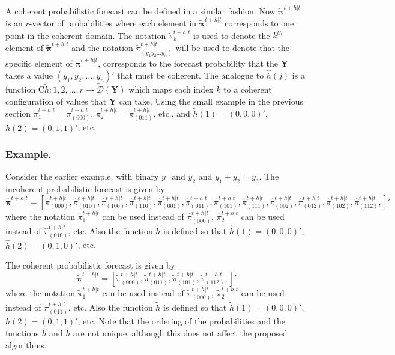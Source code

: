 \documentclass[a4paper,review,12pt,authoryear]{elsarticle}
\newcommand{\bY}{\mathbf{Y}}
\newcommand{\bpi}{\bm{\pi}}
\begin{document}
  A coherent probabilistic forecast can be defined in a similar fashion. Now $\tilde{\bpi}^{t+h|t}$ is an $r$-vector of probabilities where each element in $\tilde{\bpi}^{t+h|t}$ corresponds to one point in the coherent domain. The notation $\tilde{\pi}_k^{t+h|t}$ is used to denote the $k^{th}$ element of $\tilde{\bpi}^{t+h|t}$ and the notation $\tilde{\pi}_{(y_1 y_2 \dots y_n)}^{t+h|t}$ will be used to denote that the specific element of $\tilde{\bpi}^{t+h|t}$, corresponds to the forecast probability that the $\bY$ takes a value $(y_1,y_2,\dots,y_n)'$ that must be coherent. The analogue to $\hat{h}(j)$ is a function  C$\tilde{h}:{1,2,\dots,r}\rightarrow\tilde{\mathcal{D}}(\bY)$ which maps each index $k$ to a coherent configuration of values that $\bY$ can take. Using the small example in the previous section $\tilde{\pi}_1^{t+h|t}=\tilde{\pi}_{(000)}^{t+h|t}$, $\tilde{\pi}_2^{t+h|t}=\tilde{\pi}_{(011)}^{t+h|t}$, etc., and $\tilde{h}(1)=(0,0,0)'$, $\tilde{h}(2)=(0,1,1)'$, etc.
  
  \subsubsection*{\textbf{Example}.}
  
  Consider the earlier example, with binary $y_1$ and $y_2$ and $y_1+y_2=y_3$. The incoherent probabilistic forecast is given by
  \[
    \hat{\bpi}^{t+h|t}= \left[       
      \hat{\pi}^{t+h|t}_{(000)},
       \hat{\pi}^{t+h|t}_{(010)},
       \hat{\pi}^{t+h|t}_{(100)},
       \hat{\pi}^{t+h|t}_{(110)},
       \hat{\pi}^{t+h|t}_{(001)},
       \hat{\pi}^{t+h|t}_{(011)},
       \hat{\pi}^{t+h|t}_{(101)},
       \hat{\pi}^{t+h|t}_{(111)},
       \hat{\pi}^{t+h|t}_{(002)},
       \hat{\pi}^{t+h|t}_{(012)},
       \hat{\pi}^{t+h|t}_{(102)},
       \hat{\pi}^{t+h|t}_{(112)},
       \right]'
  \]
  where the notation $\hat{\pi}^{t+h|t}_{1}$ can be used instead of $\hat{\pi}^{t+h|t}_{(000)}$, $\hat{\pi}^{t+h|t}_{2}$ can be used instead of $\hat{\pi}^{t+h|t}_{(010)}$, etc. Also the function $\hat{h}$ is defined so that $\hat{h}(1)=(0,0,0)'$, $\hat{h}(2)=(0,1,0)'$, etc.
  
  The coherent probabilistic forecast is given by
  \[
  \tilde{\bpi}^{t+h|t}=\left[
  \tilde{\pi}^{t+h|t}_{(000)},
  \tilde{\pi}^{t+h|t}_{(011)},
  \tilde{\pi}^{t+h|t}_{(101)},
  \tilde{\pi}^{t+h|t}_{(112)},
  \right]'\]
  where the notation $\tilde{\pi}^{t+h|t}_{1}$ can be used instead of $\tilde{\pi}^{t+h|t}_{(000)}$, $\tilde{\pi}^{t+h|t}_{2}$ can be used instead of $\tilde{\pi}^{t+h|t}_{(011)}$, etc. Also the function $\tilde{h}$ is defined so that $\tilde{h}(1)=(0,0,0)'$, $\tilde{h}(2)=(0,1,1)'$, etc. Note that the ordering of the probabilities and the functions $\hat{h}$ and $\tilde{h}$ are not unique, although this does not affect the proposed algorithms.
\end{document}
